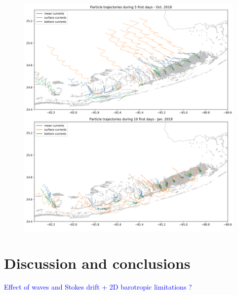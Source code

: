 \documentclass[utf8]{frontiersSCNS}
\begin{document}
\begin{figure}
    \centering
    \includegraphics[width=.9\textwidth]{figures/traj.png}
    \caption{}
    \label{fig:traj}
\end{figure}


\section{Discussion and conclusions}

\textcolor{blue}{Effect of waves and Stokes drift + 2D barotropic limitations ?}
\end{document}
